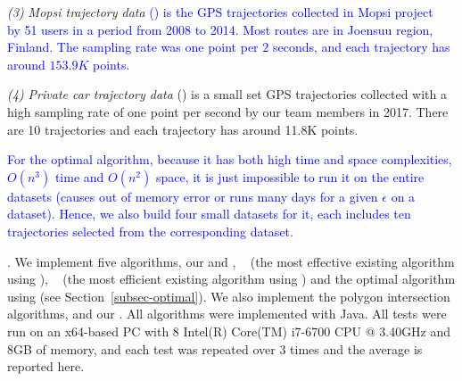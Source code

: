 \vspace{0.5ex}
\ni \emph{(3) Mopsi trajectory data} \textcolor{blue}{(\mopsi) is the GPS trajectories collected in Mopsi project~\cite{Mopsi} by 51 users in a period from 2008 to 2014. Most routes are in Joensuu region, Finland. 
The sampling rate was one point per $2$ seconds, and each trajectory has around $153.9K$ points.}

\vspace{0.5ex}
\ni \emph{(4) Private car trajectory data} (\pricar) is a small set GPS trajectories  collected with a high sampling rate of one point per second by our team members in 2017. There are 10 trajectories and each trajectory has around 11.8K points.



\textcolor{blue}{For the optimal algorithm, because it has both high time and space complexities, \ie $O(n^3)$ time and $O(n^2)$ space, it is just impossible to run it on the entire datasets (causes out of memory error or runs many days for a given $\epsilon$ on a dataset). Hence, we also build four small datasets for it, each includes ten  trajectories selected from the corresponding dataset.}


.
We implement five \lsa algorithms, \ie our \cist and \cista, \dps~\cite{Meratnia:Spatiotemporal} (the most effective existing \lsa algorithm using \sed), \squishe~\cite{Muckell:Compression} (the most efficient existing \lsa algorithm using \sed) and the optimal algorithm using \sed (see Section~\ref{subsec-optimal}).
We also implement the polygon intersection algorithms, \cpia and our \rpia.
All algorithms were implemented with Java.
All tests were run on an {x64-based  PC with 8 Intel(R) Core(TM) i7-6700 CPU @ 3.40GHz and 8GB of memory, and each test was repeated
over 3 times and the average is reported here}.
%

